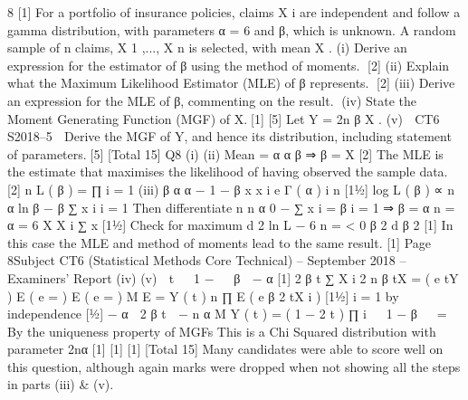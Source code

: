 8
[1]
For a portfolio of insurance policies, claims X i are independent and follow a gamma
distribution, with parameters α = 6 and β, which is unknown.
A random sample of n claims, X 1 ,..., X n is selected, with mean X .
(i) Derive an expression for the estimator of β using the method of moments. [2]
(ii) Explain what the Maximum Likelihood Estimator (MLE) of β represents. [2]
(iii) Derive an expression for the MLE of β, commenting on the result.
(iv) State the Moment Generating Function (MGF) of X.[1]
[5]
Let Y = 2n β X .
(v)

CT6 S2018–5 
Derive the MGF of Y, and hence its distribution, including statement of
parameters.[5]
[Total 15]
Q8
(i)
(ii)
Mean = α
α
β ⇒ β = X
[2]
The MLE is the estimate that maximises the likelihood of having observed the
sample data.
[2]
n
L ( β ) = ∏
i = 1
(iii)
β α α − 1 − β x
x i e
Γ ( α )
i
n
[11⁄2]
log L ( β ) ∝ n α ln β − β ∑ x i
i = 1
Then differentiate
n
n α
0
− ∑ x i =
β
i = 1
⇒ β = α n
= α = 6
X
X
i
∑ x
[11⁄2]
Check for maximum
d 2 ln L − 6 n
=
< 0
β 2
d β 2 [1]
In this case the MLE and method of moments lead to the same result. [1]
Page 8Subject CT6 (Statistical Methods Core Technical) – September 2018 – Examiners’ Report
(iv)
(v)

t 
 1 − 
 β 
− α
[1]
2 β t ∑ X i
2 n β tX
=
( e tY ) E ( e =
) E ( e =
)
M
E =
Y ( t )
n
∏ E ( e β
2 tX i
)
[11⁄2]
i = 1
by independence
[1⁄2]
− α
 2 β t 
− n α
M Y ( t ) =
( 1 − 2 t )
∏ i   1 − β   =
By the uniqueness property of MGFs
This is a Chi Squared distribution with parameter 2nα
[1]
[1]
[1]
[Total 15]
Many candidates were able to score well on this question, although again marks were
dropped when not showing all the steps in parts (iii) & (v).
